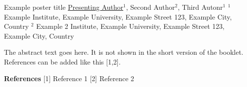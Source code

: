 \begin{abstract_poster}
    {%
        Example poster title
    }{%
        \underline{Presenting Author}$^1$, Second Author$^{2}$, Third Autonr$^1$
    }{%
        $^1$ Example Institute, Example University, Example Street 123, Example City, Country\newline{}
        $^2$ Example 2 Institute, Example University, Example Street 123, Example City, Country\newline{}
    }    
    
    The abstract text goes here. It is not shown in the short version of the 
    booklet. \\
    References can be added like this [1,2].


    \textbf{References}\newline{}
    [1] Reference 1\newline{}
    [2] Reference 2\newline{}

\end{abstract_poster}
    
